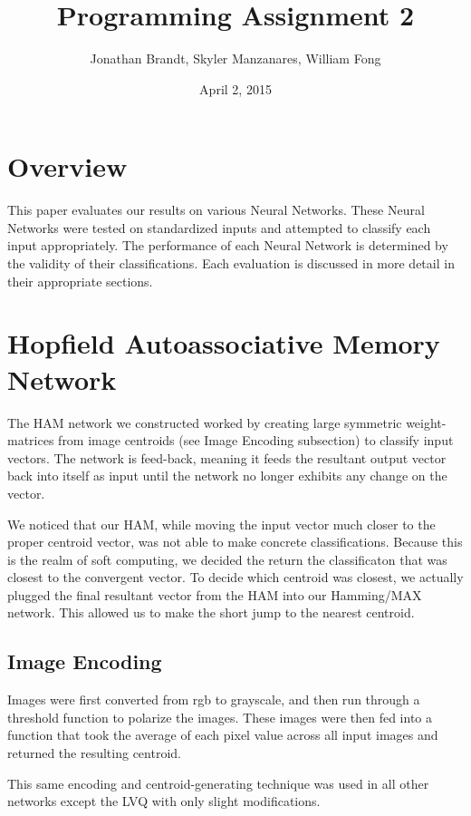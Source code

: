 \documentclass{article}
\begin{document}
\author{Jonathan Brandt, Skyler Manzanares, William Fong}
\date{April 2, 2015}
\title{Programming Assignment 2}

\maketitle

\section{Overview}
This paper evaluates our results on various Neural Networks. These Neural
Networks were tested on standardized inputs and attempted to classify each
input appropriately. The performance of each Neural Network is determined by
the validity of their classifications. Each evaluation is discussed in more
detail in their appropriate sections.
\section{Hopfield Autoassociative Memory Network}
The HAM network we constructed worked by creating large symmetric weight-matrices from image centroids (see Image Encoding subsection) to classify input vectors. The network is feed-back, meaning it feeds the resultant output vector back into itself as input until the network no longer exhibits any change on the vector. 

We noticed that our HAM, while moving the input vector much closer to the proper centroid vector, was not able to make concrete classifications. Because this is the realm of soft computing, we decided the return the classificaton that was closest to the convergent vector. To decide which centroid was closest, we actually plugged the final resultant vector from the HAM into our Hamming/MAX network. This allowed us to make the short jump to the nearest centroid.

\subsection{Image Encoding}
Images were first converted from rgb to grayscale, and then run through a threshold function to polarize the images. These images were then fed into a function that took the average of each pixel value across all input images and returned the resulting centroid.

This same encoding and centroid-generating technique was used in all other networks except the LVQ with only slight modifications.
\end{document}
